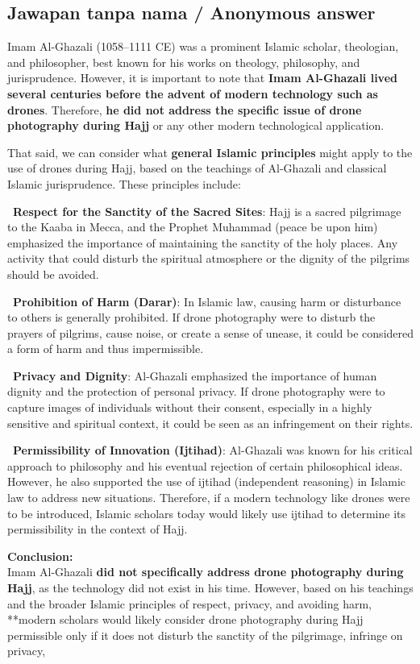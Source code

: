 \documentclass[11pt,a4paper]{article}
\begin{document}
\subsection*{Jawapan tanpa nama / Anonymous answer}
Imam Al-Ghazali (1058–1111 CE) was a prominent Islamic scholar, theologian, and philosopher, best known for his works on theology, philosophy, and jurisprudence. However, it is important to note that \textbf{Imam Al-Ghazali lived several centuries before the advent of modern technology such as drones}. Therefore, \textbf{he did not address the specific issue of drone photography during Hajj} or any other modern technological application.\par\medskip That said, we can consider what \textbf{general Islamic principles} might apply to the use of drones during Hajj, based on the teachings of Al-Ghazali and classical Islamic jurisprudence. These principles include:\par\medskip \textbullet\ \textbf{Respect for the Sanctity of the Sacred Sites}: Hajj is a sacred pilgrimage to the Kaaba in Mecca, and the Prophet Muhammad (peace be upon him) emphasized the importance of maintaining the sanctity of the holy places. Any activity that could disturb the spiritual atmosphere or the dignity of the pilgrims should be avoided.\par\medskip \textbullet\ \textbf{Prohibition of Harm (Darar)}: In Islamic law, causing harm or disturbance to others is generally prohibited. If drone photography were to disturb the prayers of pilgrims, cause noise, or create a sense of unease, it could be considered a form of harm and thus impermissible.\par\medskip \textbullet\ \textbf{Privacy and Dignity}: Al-Ghazali emphasized the importance of human dignity and the protection of personal privacy. If drone photography were to capture images of individuals without their consent, especially in a highly sensitive and spiritual context, it could be seen as an infringement on their rights.\par\medskip \textbullet\ \textbf{Permissibility of Innovation (Ijtihad)}: Al-Ghazali was known for his critical approach to philosophy and his eventual rejection of certain philosophical ideas. However, he also supported the use of ijtihad (independent reasoning) in Islamic law to address new situations. Therefore, if a modern technology like drones were to be introduced, Islamic scholars today would likely use ijtihad to determine its permissibility in the context of Hajj.\par\medskip \textbf{Conclusion:}\\ Imam Al-Ghazali \textbf{did not specifically address drone photography during Hajj}, as the technology did not exist in his time. However, based on his teachings and the broader Islamic principles of respect, privacy, and avoiding harm, **modern scholars would likely consider drone photography during Hajj permissible only if it does not disturb the sanctity of the pilgrimage, infringe on privacy,
\end{document}
